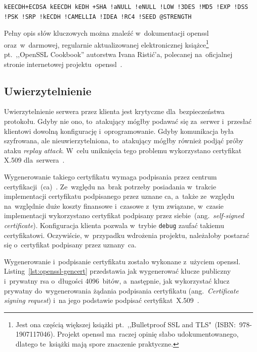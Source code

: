 \documentclass[thesis]{subfiles}
\begin{document}
\begin{lstlisting}[numbers=none,caption={Filtr \gls{openssl} dla algorytmów użytych w~projekcie},label=lst:openssl-filter]
kEECDH+ECDSA kEECDH kEDH +SHA !aNULL !eNULL !LOW !3DES !MD5 !EXP !DSS !PSK !SRP !kECDH !CAMELLIA !IDEA !RC4 !SEED @STRENGTH
\end{lstlisting}

Pełny opis słów kluczowych można znaleźć w~dokumentacji \gls{openssl} oraz~w~darmowej, regularnie aktualizowanej elektronicznej książce\footnote{Jest ona częścią większej książki pt.~,,Bulletproof SSL and TLS"~(ISBN:~978-1907117046). Projekt \gls{openssl} ma~raczej opinię słabo udokumentowanego, dlatego te~książki mają spore znaczenie praktyczne.} pt.~,,OpenSSL Cookbook'' autorstwa Ivana Ristić'a, polecanej na~oficjalnej stronie internetowej projektu~\gls{openssl}~\cite{openssl-cookbook-suites}.


\subsection{Uwierzytelnienie}

Uwierzytelnienie serwera przez klienta jest krytyczne dla~bezpieczeństwa protokołu. Gdyby nie ono, to~atakujący mógłby podawać się za~serwer i~przesłać klientowi dowolną konfigurację i~oprogramowanie. Gdyby komunikacja była szyfrowana, ale nieuwierzytelniona, to~atakujący mógłby również podjąć próby ataku \emph{replay attack}. W~celu uniknięcia tego problemu wykorzystano certyfikat X.509 dla~serwera~\cite{wiki:x509}.

Wygenerowanie takiego certyfikatu wymaga podpisania przez centrum certyfikacji~(\gls{ca})~\cite{wiki:ca}. Ze~względu na~brak potrzeby posiadania w~trakcie implementacji certyfikatu podpisanego przez uznane \gls{ca}, a~także ze~względu na~względnie duże koszty finansowe i~czasowe z~tym związane, w~czasie implementacji wykorzystano certyfikat podpisany przez siebie~(ang.~\emph{self-signed certificate}). Konfiguracja klienta pozwala w~trybie \texttt{debug} zaufać takiemu certyfikatowi. Oczywiście, w~przypadku wdrożenia projektu, należałoby postarać się o~certyfikat podpisany przez uznany~\gls{ca}.

Wygenerowanie i~podpisanie certyfikatu zostało wykonane z~użyciem \gls{openssl}. Listing~\ref{lst:openssl-gencert} przedstawia jak wygenerować klucze publiczny i~prywatny \gls{rsa} o~długości 4096~bitów, a~następnie, jak wykorzystać klucz prywatny do~wygenerowania żądania podpisania certyfikatu (ang.~\emph{Certificate signing request}) i~na jego podstawie podpisać certyfikat~X.509~\cite{openssl-cookbook,wiki:csr}.
\end{document}
